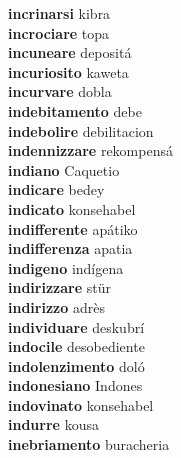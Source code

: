 \textbf{incrinarsi } kibra \\
\textbf{incrociare } topa \\
\textbf{incuneare } depositá \\
\textbf{incuriosito } kaweta \\
\textbf{incurvare } dobla \\
\textbf{indebitamento } debe \\
\textbf{indebolire } debilitacion \\
\textbf{indennizzare } rekompensá \\
\textbf{indiano } Caquetio \\
\textbf{indicare } bedey \\
\textbf{indicato } konsehabel \\
\textbf{indifferente } apátiko \\
\textbf{indifferenza } apatia \\
\textbf{indigeno } indígena \\
\textbf{indirizzare } stür \\
\textbf{indirizzo } adrès \\
\textbf{individuare } deskubrí \\
\textbf{indocile } desobediente \\
\textbf{indolenzimento } doló \\
\textbf{indonesiano } Indones \\
\textbf{indovinato } konsehabel \\
\textbf{indurre } kousa \\
\textbf{inebriamento } buracheria \\
